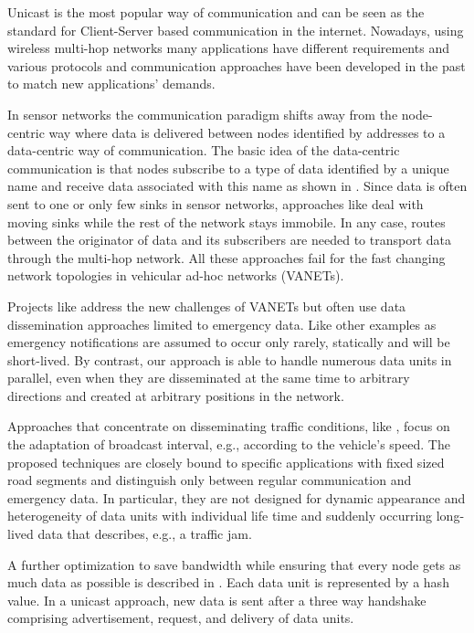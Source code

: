 \documentclass{acmrip}
\begin{document}
Unicast is the most popular way of communication and can be seen as
the standard for Client-Server based communication in the internet.
Nowadays, using wireless multi-hop networks many applications have
different requirements and various protocols and communication
approaches have been developed in the past to match new
applications' demands.

In sensor networks the communication paradigm shifts away from the
node-centric way where data is delivered between nodes identified by
addresses to a data-centric way of communication. The basic idea of
the data-centric communication is that nodes subscribe to a type of
data identified by a unique name and receive data associated with
this name as shown in \cite{638335,can,774785}.
Since data is often sent to one or only few sinks in sensor
networks, approaches like \cite{YLC02} deal with moving sinks while
the rest of the network stays immobile. In any case, routes between
the originator of data and its subscribers are needed to transport
data through the multi-hop network. All these approaches fail for
the fast changing network topologies in vehicular ad-hoc networks
(VANETs).

Projects like \cite{FLEETNET} address the new challenges of VANETs
but often use data dissemination approaches limited to emergency
data. Like other examples as \cite{1023879,OKG2006} emergency
notifications are assumed to occur only rarely, statically and will
be short-lived. By contrast, our approach is able to handle numerous
data units in parallel, even when they are disseminated at the same
time to arbitrary directions and created at arbitrary positions in
the network.

Approaches that concentrate on disseminating traffic conditions,
like \cite{wischhof03adaptive,xuba2006}, focus on the adaptation of
broadcast interval, e.g., according to the vehicle's speed. The
proposed techniques are closely bound to specific applications with
fixed sized road segments and distinguish only between regular
communication and emergency data. In particular, they are not
designed for dynamic appearance and heterogeneity of data units with
individual life time and suddenly occurring long-lived data that
describes, e.g., a traffic jam.

A further optimization to save bandwidth while ensuring that every
node gets as much data as possible is described in \cite{313529}.
Each data unit is represented by a hash value. In a unicast
approach, new data is sent after a three way handshake comprising
advertisement, request, and delivery of data units.
\end{document}
